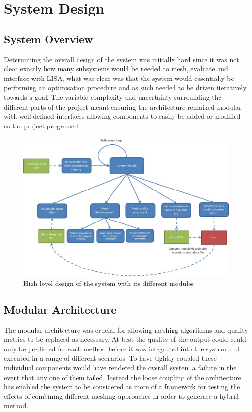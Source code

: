 \section{System Design}

\subsection{System Overview}
Determining the overall design of the system was initially hard since it was not clear exactly how many subsystems would be needed to mesh, evaluate and interface with LISA, what was clear was that the system would essentially be performing an optimisation procedure and as such needed to be driven iteratively towards a goal. The variable complexity and uncertainty surrounding the different parts of the project meant ensuring the architecture remained modular with well defined interfaces allowing components to easily be added or modified as the project progressed. \\ 

\begin{figure}[!h]
  \centerline{\includegraphics[width=150mm, scale=1]{../Graphics/SystemDesignDiagram.jpeg}}
  \caption{High level design of the system with its different modules}
  \label{fig:h-refinementImp}
\end{figure}


\subsection{Modular Architecture}
The modular architecture was crucial for allowing meshing algorithms and quality metrics to be replaced as necessary. At best the quality of the output could could only be predicted for each method before it was integrated into the system and executed in a range of different scenarios. To have tightly coupled these individual components would have rendered the overall system a failure in the event that any one of them failed. Instead the loose coupling of the architecture has enabled the system to be considered as more of a framework for testing the effects of combining different meshing approaches in order to generate a hybrid method.\\

